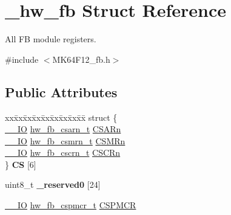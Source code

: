 \hypertarget{struct__hw__fb}{}\section{\+\_\+hw\+\_\+fb Struct Reference}
\label{struct__hw__fb}


All FB module registers.  




{\ttfamily \#include $<$M\+K64\+F12\+\_\+fb.\+h$>$}

\subsection*{Public Attributes}
\begin{DoxyCompactItemize}
\item 
\begin{tabbing}
xx\=xx\=xx\=xx\=xx\=xx\=xx\=xx\=xx\=\kill
struct \{\\
\>\hyperlink{core__sc300_8h_aec43007d9998a0a0e01faede4133d6be}{\_\_IO} \hyperlink{union__hw__fb__csarn}{hw\_fb\_csarn\_t} \hyperlink{struct__hw__fb_a6f6705c0a01e210de6a9b542d1fa413b}{CSARn}\\
\>\hyperlink{core__sc300_8h_aec43007d9998a0a0e01faede4133d6be}{\_\_IO} \hyperlink{union__hw__fb__csmrn}{hw\_fb\_csmrn\_t} \hyperlink{struct__hw__fb_af50654554bc7984891f2692ab12996f6}{CSMRn}\\
\>\hyperlink{core__sc300_8h_aec43007d9998a0a0e01faede4133d6be}{\_\_IO} \hyperlink{union__hw__fb__cscrn}{hw\_fb\_cscrn\_t} \hyperlink{struct__hw__fb_adca92a82a144e4395d9d058856e0c86c}{CSCRn}\\
\} {\bfseries CS} \mbox{[}6\mbox{]}\hypertarget{struct__hw__fb_a525ee7af8c92361de9b3f7cc374d99d2}{}\label{struct__hw__fb_a525ee7af8c92361de9b3f7cc374d99d2}
\\

\end{tabbing}\item 
uint8\+\_\+t {\bfseries \+\_\+reserved0} \mbox{[}24\mbox{]}\hypertarget{struct__hw__fb_a8d6a6787ec5c857c65f20af1062497f4}{}\label{struct__hw__fb_a8d6a6787ec5c857c65f20af1062497f4}

\item 
\hyperlink{core__sc300_8h_aec43007d9998a0a0e01faede4133d6be}{\+\_\+\+\_\+\+IO} \hyperlink{union__hw__fb__cspmcr}{hw\+\_\+fb\+\_\+cspmcr\+\_\+t} \hyperlink{struct__hw__fb_aa48c688bd99fa9f106382ae409fb8081}{C\+S\+P\+M\+CR}
\end{DoxyCompactItemize}


